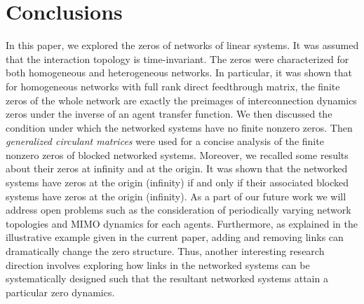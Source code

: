 \documentclass[twocolumn]{autart}    \usepackage{amsmath}
\begin{document}
\section{Conclusions}\label{sec:conclusion}
In this paper, we explored the zeros of  networks of linear
systems. It was assumed that the interaction topology is time-invariant.  The zeros  were  characterized for both homogeneous and
heterogeneous networks. In particular, it was  shown that for homogeneous
networks with  full rank direct feedthrough
matrix,  the finite zeros of the whole network  are
exactly the preimages of interconnection dynamics zeros  under the  inverse of an agent transfer
function. We then discussed the condition under which the networked systems  have  no finite nonzero zeros. Then
\textit{ generalized circulant matrices} were used for a concise
analysis of the  finite nonzero zeros of blocked networked  systems. Moreover, we recalled some results about their zeros at infinity and at the origin.  It was shown that the  networked systems have zeros at the origin  (infinity) if and only if their associated blocked systems have zeros at the origin (infinity). As a part of our future work  we will
address open problems such as the consideration of periodically varying network topologies and MIMO dynamics for each agents. Furthermore, as explained in the  illustrative example given in the current paper,  adding and removing links can dramatically change the  zero  structure. Thus, another interesting  research direction involves exploring how links in the  networked systems  can be  systematically  designed  such that the resultant networked systems   attain   a particular zero dynamics.






           
\end{document}
